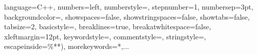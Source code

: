 \lstset
{
  language=C++,                %
  numbers=left,                   %
  numberstyle=\color{gray},  %
  stepnumber=1,                   %
  numbersep=3pt,                  %
  backgroundcolor=\color{white},      %
  showspaces=false,               %
  showstringspaces=false,         %
  showtabs=false,                 %
  tabsize=2,                      %
  basicstyle=\footnotesize,
  breaklines=true,                %
  breakatwhitespace=false,        %
  xleftmargin=12pt,
  keywordstyle=\color{blue},          %
  commentstyle=\color{darkgreen},       %
  stringstyle=\color{red},         %
  escapeinside={\%*}{*)},            %
  morekeywords={*,...}               %
}
\usepackage{graphicx}
\usepackage{color}
\usepackage{strona_tytulowa}

\usepackage{etex}	%

